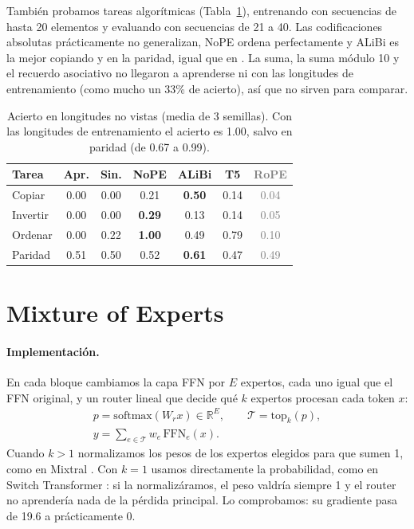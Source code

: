 \documentclass[11pt]{article}
\begin{document}
También probamos tareas algorítmicas (Tabla~\ref{tab:tasks}), entrenando con secuencias de hasta 20 elementos y evaluando con secuencias de 21 a 40.
Las codificaciones absolutas prácticamente no generalizan, NoPE ordena perfectamente y ALiBi es la mejor copiando y en la paridad, igual que en \citet{kazemnejad2023impact}.
La suma, la suma módulo 10 y el recuerdo asociativo no llegaron a aprenderse ni con las longitudes de entrenamiento (como mucho un 33\% de acierto), así que no sirven para comparar.

\begin{table}[t]
\centering\small\setlength{\tabcolsep}{3.5pt}
\begin{tabular}{@{}lcccccc@{}}
\toprule
Tarea & Apr. & Sin. & NoPE & ALiBi & T5 & \textcolor{gray}{RoPE} \\
\midrule
Copiar & 0.00 & 0.00 & 0.21 & \textbf{0.50} & 0.14 & \textcolor{gray}{0.04} \\
Invertir & 0.00 & 0.00 & \textbf{0.29} & 0.13 & 0.14 & \textcolor{gray}{0.05} \\
Ordenar & 0.00 & 0.22 & \textbf{1.00} & 0.49 & 0.79 & \textcolor{gray}{0.10} \\
Paridad & 0.51 & 0.50 & 0.52 & \textbf{0.61} & 0.47 & \textcolor{gray}{0.49} \\
\bottomrule
\end{tabular}
\caption{Acierto en longitudes no vistas (media de 3 semillas). Con las longitudes de entrenamiento el acierto es 1.00, salvo en paridad (de 0.67 a 0.99).}
\label{tab:tasks}
\end{table}

\section{Mixture of Experts}
\label{sec:moe}
\paragraph{Implementación.}
En cada bloque cambiamos la capa FFN por $E$ expertos, cada uno igual que el FFN original, y un router lineal que decide qué $k$ expertos procesan cada token $x$:
\begin{equation}
\begin{gathered}
p = \mathrm{softmax}(W_r x)\in\mathbb{R}^E,\qquad \mathcal{T} = \mathrm{top}_k(p),\\
y = \textstyle\sum_{e\in\mathcal{T}} w_e\,\mathrm{FFN}_e(x).
\end{gathered}
\end{equation}
Cuando $k>1$ normalizamos los pesos de los expertos elegidos para que sumen 1, como en Mixtral \citep{jiang2024mixtral}.
Con $k=1$ usamos directamente la probabilidad, como en Switch Transformer \citep{fedus2022switch}: si la normalizáramos, el peso valdría siempre 1 y el router no aprendería nada de la pérdida principal. Lo comprobamos: su gradiente pasa de 19.6 a prácticamente 0.
\end{document}
